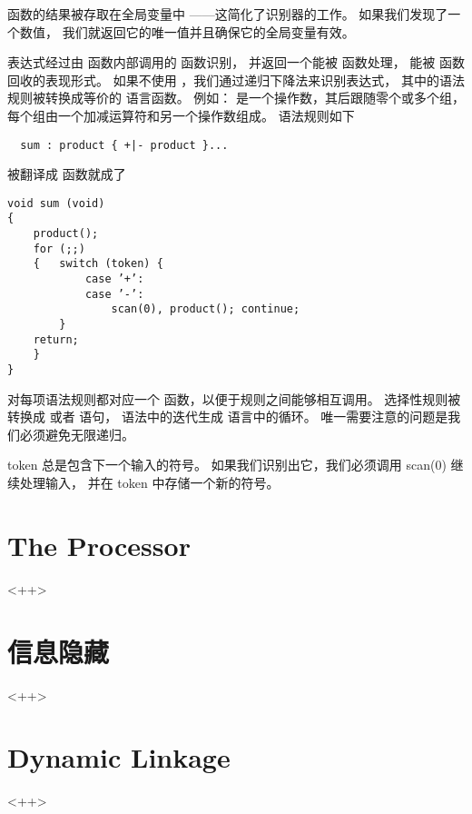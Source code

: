  函数的结果被存取在全局变量中
——这简化了识别器的工作。
如果我们发现了一个数值，
我们就返回它的唯一值并且确保它的全局变量有效。


表达式经过由  函数内部调用的  函数识别，
并返回一个能被  函数处理，
能被  函数回收的表现形式。
如果不使用 ，我们通过递归下降法来识别表达式，
其中的语法规则被转换成等价的  语言函数。
例如： 是一个操作数，其后跟随零个或多个组，
每个组由一个加减运算符和另一个操作数组成。
语法规则如下
\begin{lstlisting}
  sum : product { +|- product }...
\end{lstlisting}
被翻译成  函数就成了
\begin{lstlisting}
void sum (void)
{
    product();
    for (;;)
    {   switch (token) {
            case ’+’:
            case ’-’:
                scan(0), product(); continue;
        }
    return;
    }
}
\end{lstlisting}

对每项语法规则都对应一个  函数，以便于规则之间能够相互调用。
选择性规则被转换成  或者  语句，
语法中的迭代生成  语言中的循环。
唯一需要注意的问题是我们必须避免无限递归。

token 总是包含下一个输入的符号。
如果我们识别出它，我们必须调用 scan(0) 继续处理输入，
并在 token 中存储一个新的符号。


\section{The Processor}<++>

\section{信息隐藏}<++>

\section{Dynamic Linkage}<++>


